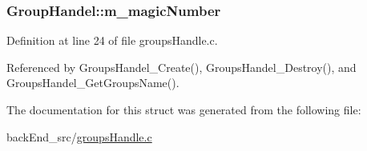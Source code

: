 \subsubsection[{\texorpdfstring{m\+\_\+magic\+Number}{m_magicNumber}}]{ Group\+Handel\+::m\+\_\+magic\+Number}\hypertarget{structGroupHandel_a57ff08319c57f99db13ce449a532dad5}{}\label{structGroupHandel_a57ff08319c57f99db13ce449a532dad5}


Definition at line 24 of file groups\+Handle.\+c.



Referenced by Groups\+Handel\+\_\+\+Create(), Groups\+Handel\+\_\+\+Destroy(), and Groups\+Handel\+\_\+\+Get\+Groups\+Name().



The documentation for this struct was generated from the following file\+:\begin{DoxyCompactItemize}
\item 
back\+End\+\_\+src/\hyperlink{groupsHandle_8c}{groups\+Handle.\+c}\end{DoxyCompactItemize}
